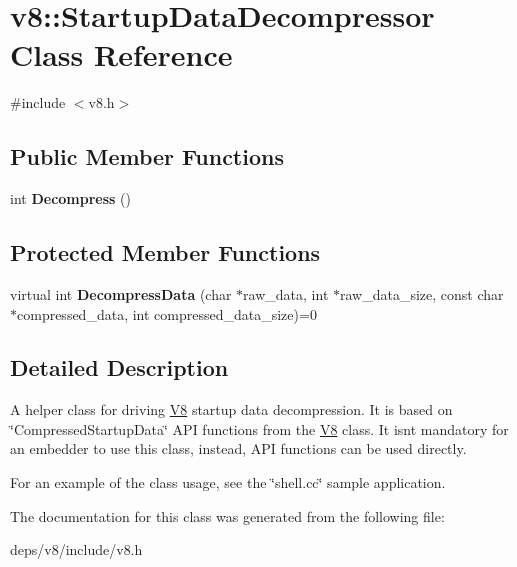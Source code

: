 \hypertarget{classv8_1_1_startup_data_decompressor}{}\section{v8\+:\+:Startup\+Data\+Decompressor Class Reference}
\label{classv8_1_1_startup_data_decompressor}


{\ttfamily \#include $<$v8.\+h$>$}

\subsection*{Public Member Functions}
\begin{DoxyCompactItemize}
\item 
\hypertarget{classv8_1_1_startup_data_decompressor_aa970485a491f415500bfb0632e472ab7}{}int {\bfseries Decompress} ()\label{classv8_1_1_startup_data_decompressor_aa970485a491f415500bfb0632e472ab7}

\end{DoxyCompactItemize}
\subsection*{Protected Member Functions}
\begin{DoxyCompactItemize}
\item 
\hypertarget{classv8_1_1_startup_data_decompressor_a503b3e37337dfc60729e773ca60827b9}{}virtual int {\bfseries Decompress\+Data} (char $\ast$raw\+\_\+data, int $\ast$raw\+\_\+data\+\_\+size, const char $\ast$compressed\+\_\+data, int compressed\+\_\+data\+\_\+size)=0\label{classv8_1_1_startup_data_decompressor_a503b3e37337dfc60729e773ca60827b9}

\end{DoxyCompactItemize}


\subsection{Detailed Description}
A helper class for driving \hyperlink{classv8_1_1_v8}{V8} startup data decompression. It is based on \char`\"{}\+Compressed\+Startup\+Data\char`\"{} A\+P\+I functions from the \hyperlink{classv8_1_1_v8}{V8} class. It isn\textquotesingle{}t mandatory for an embedder to use this class, instead, A\+P\+I functions can be used directly.

For an example of the class usage, see the \char`\"{}shell.\+cc\char`\"{} sample application. 

The documentation for this class was generated from the following file\+:\begin{DoxyCompactItemize}
\item 
deps/v8/include/v8.\+h\end{DoxyCompactItemize}
